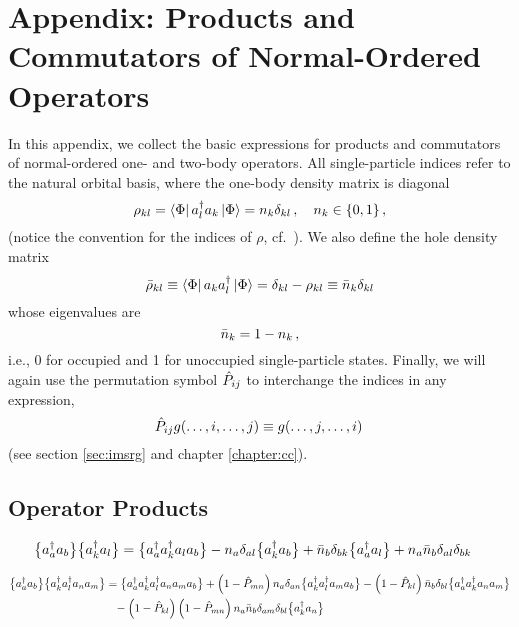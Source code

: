 \section*{Appendix: Products and Commutators of Normal-Ordered Operators}
In this appendix, we collect the basic expressions for products and commutators of
normal-ordered one- and two-body operators. All single-particle indices refer to 
the natural orbital basis, where the one-body density matrix is diagonal
\begin{equation}
  \rho_{kl} = \langle{\Phi}|\,{a^\dag_{l}a_{k}}\,|{\Phi}\rangle  = n_k \delta_{kl}\,,\quad n_k\in\{0,1\}\,,
\end{equation}
(notice the convention for the indices of $\rho$, cf.~\cite{Ring:1980bb}). We also
define the hole density matrix
\begin{equation}
  \bar\rho_{kl} \equiv \langle{\Phi}|\,{a_{k}a^\dag_{l}}\,|{\Phi}\rangle  = \delta_{kl} - \rho_{kl} \equiv \bar{n}_k\delta_{kl}
\end{equation}
whose eigenvalues are 
\begin{equation}
  \bar{n}_{k}  = 1 - n_{k}\,,
\end{equation}
i.e., 0 for occupied and 1 for unoccupied single-particle states. Finally, 
we will again use the permutation symbol $\hat{P}_{ij}$ to interchange the indices 
in any expression, 
\begin{equation}\label{eq:def_Pij}
  \PO_{ij} g(\ldots,i,\ldots,j) \equiv g(\ldots,j,\ldots,i)\,
\end{equation}
(see section \ref{sec:imsrg} and chapter \ref{chapter:cc}).

\subsection{Operator Products}
\begin{align}
  \big\{a^\dag_{a}a_{b}\big\}\big\{a^\dag_{k}a_{l}\big\}
  &=\big\{a^\dag_{a}a^\dag_{k}a_{l}a_{b}\big\}
    -n_a\delta_{al}\big\{a^\dag_{k}a_{b}\big\}
    +\bar{n}_b\delta_{bk}\big\{a^\dag_{a}a_{l}\big\}
    +n_a\bar{n}_b\delta_{al}\delta_{bk}
\end{align}



\begin{align}
  \big\{a^\dag_{a}a_{b}\big\}\big\{a^\dag_{k}a^\dag_{l}a_{n}a_{m}\big\}
  &=\big\{a^\dag_{a}a^\dag_{k}a^\dag_{l}a_{n}a_{m}a_{b}\big\}
    +\left(1-\hat{P}_{mn}\right)n_a\delta_{an}\big\{a^\dag_{k}a^\dag_{l}a_{m}a_{b}\big\}
    -\left(1-\hat{P}_{kl}\right)\bar{n}_b\delta_{bl}\big\{a^\dag_{a}a^\dag_{k}a_{n}a_{m}\big\}\notag\\
  &\hphantom{=}  
    -\left(1-\hat{P}_{kl}\right)\left(1-\hat{P}_{mn}\right)n_{a}\bar{n}_{b}\delta_{am}\delta_{bl}\big\{a^\dag_{k}a_{n}\big\}
\end{align}



